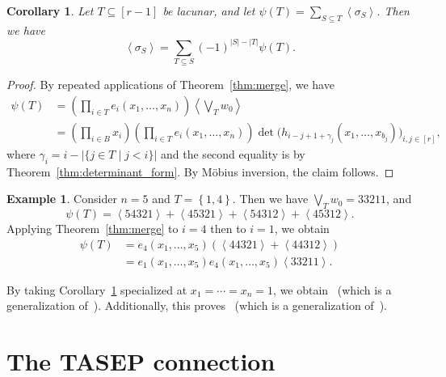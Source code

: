 \documentclass[reqno]{amsart}
\newcommand{\0}{\phantom{c}}
\newcommand{\swt}[1]{\left\langle #1 \right\rangle} %
\let\sumnonlimits\sum
\let\prodnonlimits\prod
\renewcommand{\sum}{\sumnonlimits\limits}
\renewcommand{\prod}{\prodnonlimits\limits}
\newcommand{\set}[1]{\left\{ #1 \right\}}
\newcommand{\ive}[1]{\left[ #1 \right]}
\theoremstyle{plain}
\newtheorem{cor}[thm]{Corollary}
\theoremstyle{definition}
\newtheorem{example}[thm]{Example}
\numberwithin{equation}{section}
\begin{document}
\begin{cor}
\label{cor:special_weight_lacunar}
Let $T \subseteq \ive{r-1}$ be lacunar, and let $\psi(T) = \sum_{S \subseteq T} \swt{\sigma_S}$.
Then we have
\[
\swt{\sigma_S} = \sum_{T\subseteq S} (-1)^{|S|-|T|} \psi(T).
\]
\end{cor}

\begin{proof}
By repeated applications of Theorem~\ref{thm:merge}, we have
\begin{align*}
  \psi(T) & = \left(\prod_{i\in T} e_i (x_1, \dotsc, x_n) \right) \swt{ \bigvee_T w_0}
  \\ & = \left( \prod_{i\in B} x_i \right) \left(\prod_{i\in T} e_i(x_1, \dotsc, x_n) \right) \det\bigl(h_{i-j+1+\gamma_j}(x_1, \dotsc, x_{b_j})\bigr)_{i, j \in \ive{r}},
\end{align*}
where $\gamma_i = i - \lvert \{j\in T \mid j < i \} \rvert$ and the second equality is by Theorem~\ref{thm:determinant_form}.
By M\"obius inversion, the claim follows.
\end{proof}

\begin{example}
Consider $n = 5$ and $T = \set{1,4}$.
Then we have $\bigvee_T w_0 = 33211$, and
\[
\psi(T) = \swt{54321} + \swt{45321} + \swt{54312} + \swt{45312}.
\]
Applying Theorem~\ref{thm:merge} to $i = 4$ then to $i=1$, we obtain
\begin{align*}
\psi(T) & = e_4(x_1, \dotsc, x_5) (\swt{44321} + \swt{44312})
\\ & = e_1(x_1, \dotsc, x_5) e_4(x_1, \dotsc, x_5) \swt{33211}.
\end{align*}
\end{example}

By taking Corollary~\ref{cor:special_weight_lacunar} specialized at $x_1 = \cdots = x_n = 1$, we obtain~\cite[Conj.~3.10]{AasLin17} (which is a generalization of~\cite[Conj.~3.9]{AasLin17}).
Additionally, this proves~\cite[Conj.~3.6]{AasLin17} (which is a generalization of~\cite[Conj.~3.4]{AasLin17}).










\section{The TASEP connection}
\label{sec:tasep}
\end{document}
